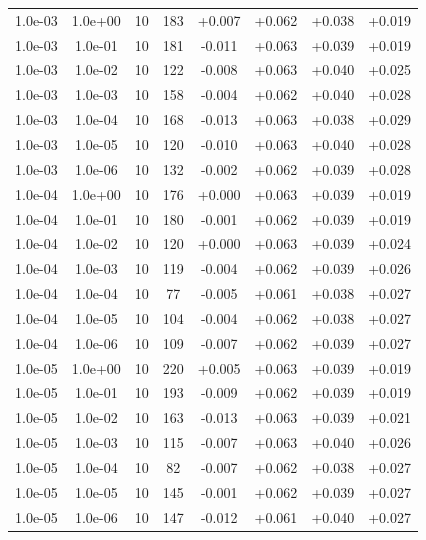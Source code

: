 \documentclass[11pt,a4paper]{article}
\begin{document}
\begin{table}
{\begin{tabular}{*{8}c}
 1.0e-03 	 & 1.0e+00 	 & 10 & 183 	 & +0.007 & +0.062 & +0.038 & +0.019 \\ 
 1.0e-03 	 & 1.0e-01 	 & 10 & 181 	 & -0.011 & +0.063 & +0.039 & +0.019 \\ 
 1.0e-03 	 & 1.0e-02 	 & 10 & 122 	 & -0.008 & +0.063 & +0.040 & +0.025 \\ 
 1.0e-03 	 & 1.0e-03 	 & 10 & 158 	 & -0.004 & +0.062 & +0.040 & +0.028 \\ 
 1.0e-03 	 & 1.0e-04 	 & 10 & 168 	 & -0.013 & +0.063 & +0.038 & +0.029 \\ 
 1.0e-03 	 & 1.0e-05 	 & 10 & 120 	 & -0.010 & +0.063 & +0.040 & +0.028 \\ 
 1.0e-03 	 & 1.0e-06 	 & 10 & 132 	 & -0.002 & +0.062 & +0.039 & +0.028 \\ 

 1.0e-04 	 & 1.0e+00 	 & 10 & 176 	 & +0.000 & +0.063 & +0.039 & +0.019 \\ 
 1.0e-04 	 & 1.0e-01 	 & 10 & 180 	 & -0.001 & +0.062 & +0.039 & +0.019 \\ 
 1.0e-04 	 & 1.0e-02 	 & 10 & 120 	 & +0.000 & +0.063 & +0.039 & +0.024 \\ 
 1.0e-04 	 & 1.0e-03 	 & 10 & 119 	 & -0.004 & +0.062 & +0.039 & +0.026 \\ 
 1.0e-04 	 & 1.0e-04 	 & 10 & 77 	 & -0.005 & +0.061 & +0.038 & +0.027 \\ 
 1.0e-04 	 & 1.0e-05 	 & 10 & 104 	 & -0.004 & +0.062 & +0.038 & +0.027 \\ 
 1.0e-04 	 & 1.0e-06 	 & 10 & 109 	 & -0.007 & +0.062 & +0.039 & +0.027 \\ 

 1.0e-05 	 & 1.0e+00 	 & 10 & 220 	 & +0.005 & +0.063 & +0.039 & +0.019 \\ 
 1.0e-05 	 & 1.0e-01 	 & 10 & 193 	 & -0.009 & +0.062 & +0.039 & +0.019 \\ 
 1.0e-05 	 & 1.0e-02 	 & 10 & 163 	 & -0.013 & +0.063 & +0.039 & +0.021 \\ 
 1.0e-05 	 & 1.0e-03 	 & 10 & 115 	 & -0.007 & +0.063 & +0.040 & +0.026 \\ 
 1.0e-05 	 & 1.0e-04 	 & 10 & 82 	 & -0.007 & +0.062 & +0.038 & +0.027 \\ 
 1.0e-05 	 & 1.0e-05 	 & 10 & 145 	 & -0.001 & +0.062 & +0.039 & +0.027 \\ 
 1.0e-05 	 & 1.0e-06 	 & 10 & 147 	 & -0.012 & +0.061 & +0.040 & +0.027 \\ 


\end{tabular}}
\end{table}
\end{document}
